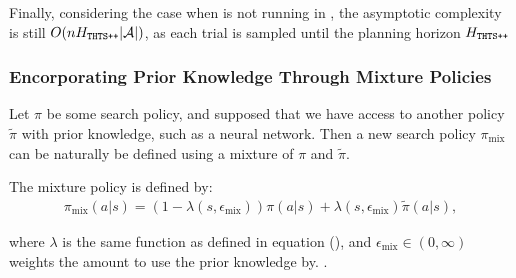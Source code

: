 
        Finally, considering the case when \thtspp\ewe is not running in \mctsmode, the asymptotic complexity is still $O(nH_{{\textnormal{\texttt{THTS++}}}}|\mathcal{A}|)$, as each trial is sampled until the planning horizon $H_{{\textnormal{\texttt{THTS++}}}}$ 




        






        \subsubsection{Encorporating Prior Knowledge Through Mixture Policies}

        Let $\pi$ be some \thtspp\ewe search policy, and supposed that we have access to another policy $\tilde{\pi}$ with prior knowledge, such as a neural network. Then a new search policy $\pi_{\text{mix}}$ can be naturally be defined using a mixture of $\pi$ and $\tilde{\pi}$.


        The mixture policy is defined by:
        \begin{align}
            \pi_{\text{mix}}(a|s) = 
                (1-\lambda(s,\epsilon_{\text{mix}})) \pi(a|s) 
                + \lambda(s,\epsilon_{\text{mix}}) \tilde{\pi}(a|s),
        \end{align}

        where $\lambda$ is the same function as defined in equation (), and $\epsilon_{\text{mix}}\in(0,\infty)$ weights the amount to use the prior knowledge by. .



        

